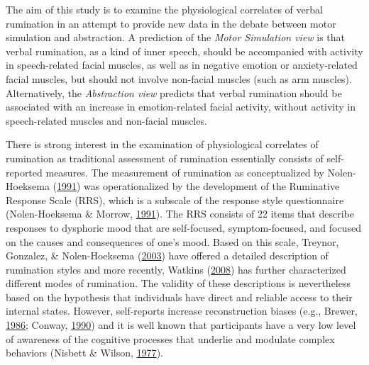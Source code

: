 \documentclass[a4paper,12pt,twoside,openright,oldfontcommands]{memoir}
\begin{document}
The aim of this study is to examine the physiological correlates of
verbal rumination in an attempt to provide new data in the debate
between motor simulation and abstraction. A prediction of the
\emph{Motor Simulation view} is that verbal rumination, as a kind of
inner speech, should be accompanied with activity in speech-related
facial muscles, as well as in negative emotion or anxiety-related facial
muscles, but should not involve non-facial muscles (such as arm
muscles). Alternatively, the \emph{Abstraction view} predicts that
verbal rumination should be associated with an increase in
emotion-related facial activity, without activity in speech-related
muscles and non-facial muscles.

There is strong interest in the examination of physiological correlates
of rumination as traditional assessment of rumination essentially
consists of self-reported measures. The measurement of rumination as
conceptualized by Nolen-Hoeksema
(\protect\hyperlink{ref-nolen-hoeksema_responses_1991}{1991}) was
operationalized by the development of the Ruminative Response Scale
(RRS), which is a subscale of the response style questionnaire
(Nolen-Hoeksema \& Morrow,
\protect\hyperlink{ref-nolen-hoeksema_prospective_1991}{1991}). The RRS
consists of 22 items that describe responses to dysphoric mood that are
self-focused, symptom-focused, and focused on the causes and
consequences of one's mood. Based on this scale, Treynor, Gonzalez, \&
Nolen-Hoeksema (\protect\hyperlink{ref-treynor_rumination_2003}{2003})
have offered a detailed description of rumination styles and more
recently, Watkins (\protect\hyperlink{ref-Watkins2008}{2008}) has
further characterized different modes of rumination. The validity of
these descriptions is nevertheless based on the hypothesis that
individuals have direct and reliable access to their internal states.
However, self-reports increase reconstruction biases (e.g., Brewer,
\protect\hyperlink{ref-rubin_what_1986}{1986}; Conway,
\protect\hyperlink{ref-conway_autobiographical_1990}{1990}) and it is
well known that participants have a very low level of awareness of the
cognitive processes that underlie and modulate complex behaviors
(Nisbett \& Wilson, \protect\hyperlink{ref-nisbett_telling_1977}{1977}).
\end{document}
